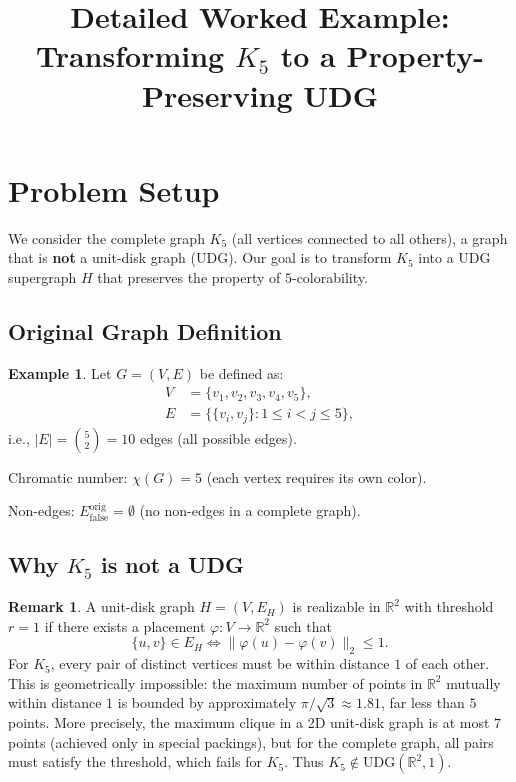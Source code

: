 \documentclass[11pt]{article}
\title{Detailed Worked Example: Transforming $K_5$ to a Property-Preserving UDG}
\author{}
\date{}
\theoremstyle{definition}
\newtheorem*{example}{Example}
\newtheorem*{remark}{Remark}
\newcommand{\Real}{\mathbb{R}}
\newcommand{\Efalse}{E_{\mathrm{false}}}
\newcommand{\UDG}{\mathrm{UDG}}
\begin{document}
\maketitle

\section{Problem Setup}

We consider the complete graph $K_5$ (all vertices connected to all others), a graph that is \textbf{not} a unit-disk graph (UDG). Our goal is to transform $K_5$ into a UDG supergraph $H$ that preserves the property of $5$-colorability.

\subsection{Original Graph Definition}

\begin{example}
Let $G = (V, E)$ be defined as:
\begin{align*}
V &= \{v_1, v_2, v_3, v_4, v_5\},\\
E &= \{\{v_i, v_j\} : 1 \le i < j \le 5\},
\end{align*}
i.e., $|E| = \binom{5}{2} = 10$ edges (all possible edges).

Chromatic number: $\chi(G) = 5$ (each vertex requires its own color).

Non-edges: $\Efalse^{\text{orig}} = \emptyset$ (no non-edges in a complete graph).
\end{example}

\subsection{Why $K_5$ is not a UDG}

\begin{remark}
A unit-disk graph $H = (V, E_H)$ is realizable in $\Real^2$ with threshold $r=1$ if there exists a placement $\varphi : V \to \Real^2$ such that
\[
\{u,v\} \in E_H \iff \|\varphi(u) - \varphi(v)\|_2 \le 1.
\]
For $K_5$, every pair of distinct vertices must be within distance $1$ of each other. This is geometrically impossible: the maximum number of points in $\Real^2$ mutually within distance $1$ is bounded by approximately $\pi / \sqrt{3} \approx 1.81$, far less than $5$ points. More precisely, the maximum clique in a 2D unit-disk graph is at most $7$ points (achieved only in special packings), but for the complete graph, all pairs must satisfy the threshold, which fails for $K_5$. Thus $K_5 \notin \UDG(\Real^2, 1)$.
\end{remark}
\end{document}
